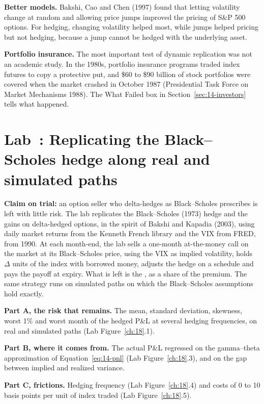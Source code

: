 \textbf{Better models.} Bakshi, Cao and Chen (1997) found that letting volatility change at random and allowing price jumps improved the pricing of S\&P 500 options. For hedging, changing volatility helped most, while jumps helped pricing but not hedging, because a jump cannot be hedged with the underlying asset.

\textbf{Portfolio insurance.} The most important test of dynamic replication was not an academic study. In the 1980s, portfolio insurance programs traded index futures to copy a protective put, and \$60 to \$90 billion of stock portfolios were covered when the market crashed in October 1987 (Presidential Task Force on Market Mechanisms 1988). The What Failed box in Section~\ref{sec:14-investors} tells what happened.

\section{Lab~\thechapter: Replicating the Black--Scholes hedge along real and simulated paths}
\label{sec:14-lab}

\textbf{Claim on trial:} an option seller who delta-hedges as Black--Scholes prescribes is left with little risk. The lab replicates the Black--Scholes (1973) hedge and the gains on delta-hedged options, in the spirit of Bakshi and Kapadia (2003), using daily market returns from the Kenneth French library and the VIX from FRED, from 1990. At each month-end, the lab sells a one-month at-the-money call on the market at its Black--Scholes price, using the VIX as implied volatility, holds $\Delta$ units of the index with borrowed money, adjusts the hedge on a schedule and pays the payoff at expiry. What is left is the , as a share of the premium. The same strategy runs on simulated paths on which the Black--Scholes assumptions hold exactly.

\textbf{Part A, the risk that remains.} The mean, standard deviation, skewness, worst 1\% and worst month of the hedged P\&L at several hedging frequencies, on real and simulated paths (Lab Figure~\ref{ch:18}.1).

\textbf{Part B, where it comes from.} The actual P\&L regressed on the gamma--theta approximation of Equation~\eqref{eq:14-pnl} (Lab Figure~\ref{ch:18}.3), and on the gap between implied and realized variance.

\textbf{Part C, frictions.} Hedging frequency (Lab Figure~\ref{ch:18}.4) and costs of 0 to 10 basis points per unit of index traded (Lab Figure~\ref{ch:18}.5).

